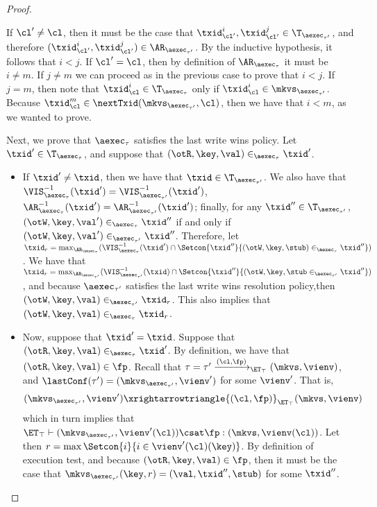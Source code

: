 \begin{proof}
\begin{itemize}
\begin{itemize}
If $\cl' \neq \cl$, then it must be the case that $\txid_{\cl'}^{i}, \txid_{\cl'}^{j} \in \T_{\aexec_{\tau'}}$, 
and therefore $(\txid_{\cl'}^{i}, \txid_{\cl'}^{j}) \in \AR_{\aexec_{\tau'}}$. By the inductive hypothesis, 
it follows that $i < j$. If $\cl' = \cl$, then by definition of $\AR_{\aexec_{\tau}}$ it must be  $i \neq m$. 
If $j \neq m$ we can proceed as in the previous case to prove that $i < j$. If $j = m$, then 
note that $\txid_{\cl}^{i} \in \T_{\aexec_{\tau}}$ only if $\txid_{\cl}^{i} \in \mkvs_{\aexec_{\tau'}}$. 
Because $\txid_{\cl}^{m} \in \nextTxid(\mkvs_{\aexec_{\tau'}}, \cl)$, then we have that $i < m$, 
as we wanted to prove.
\end{itemize}

Next, we prove that $\aexec_{\tau}$ satisfies the last write wins policy. 
Let $\txid' \in \T_{\aexec_{\tau}}$, and suppose that $(\otR, \key, \val) \in_{\aexec_{\tau}} \txid'$. 
\begin{itemize} 
\item If $\txid' \neq \txid$, then we have that $\txid \in \T_{\aexec_{\tau'}}$. We also have that 
$\VIS^{-1}_{\aexec_{\tau}}(\txid') = \VIS^{-1}_{\aexec_{\tau'}}(\txid')$, $\AR^{-1}_{\aexec_{\tau}}(\txid') 
= \AR^{-1}_{\aexec_{\tau'}}(\txid')$; finally, for any $\txid'' \in \T_{\aexec_{\tau'}}$, 
$(\otW, \key, \val') \in_{\aexec_{\tau}} \txid''$ if and only if $(\otW, \key, \val') \in_{\aexec_{\tau'}} 
\txid''$. Therefore, let $\txid_{r} = \max_{\AR_{\aexec_{\tau}}}(\VIS^{-1}_{\aexec_{\tau}}(\txid') \cap 
\Setcon{\txid'' }{ (\otW, \key, \stub) \in_{\aexec_{\tau}} \txid''})$. We have that $\txid_{r} = \max_{\AR_{\aexec_{\tau'}}}(\VIS^{-1}_{\aexec_{\tau'}}(\txid) 
\cap \Setcon{ \txid'' }{ (\otW, \key, \stub \in_{\aexec_{\tau'}} \txid''})$, and because $\aexec_{\tau'}$ satisfies the last write 
wins resolution policy,then $(\otW, \key, \val) \in_{\aexec_{\tau'}} \txid_{r}$. This also implies that 
$(\otW, \key, \val) \in_{\aexec_{\tau}} \txid_{r}$. 

\item Now, suppose that $\txid' = \txid$. Suppose that $(\otR, \key, \val) \in_{\aexec_{\tau}} \txid'$. 
By definition, we have that $(\otR, \key, \val) \in \fp$. Recall that $\tau = \tau' \xrightarrow{(\cl, \fp)}_{\ET_{\top}} (\mkvs, \vienv)$, 
and $\lastConf(\tau') = (\mkvs_{\aexec_{\tau'}}, \vienv')$ for some $\vienv'$. 
That is, 
\[
    (\mkvs_{\aexec_{\tau'}}, \vienv') \xrightarrowtriangle{(\cl, \fp)}_{\ET_{\top}} (\mkvs, \vienv)
\]
which in turn implies that $\ET_{\top} \vdash (\mkvs_{\aexec_{\tau'}}, \vienv'(\cl)) \csat \fp : (\mkvs,\vienv(\cl) )$. 
Let then $r = \max\Setcon{i}{  i \in \vienv'(\cl)(\key)}$. 
By definition of execution test, and because $(\otR, \key, \val) \in \fp$, then it must be the case that 
$\mkvs_{\aexec_{\tau'}}(\key, r) = (\val, \txid'', \stub)$ for some $\txid''$. 


\end{itemize}
\end{itemize}
\end{proof}
